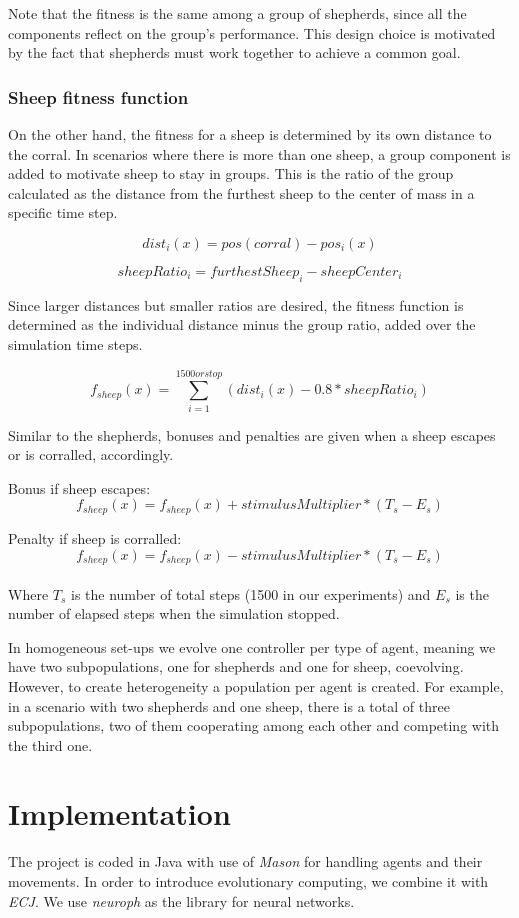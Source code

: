 \documentclass[conference]{IEEEtran}
\begin{document}
Note that the fitness is the same among a group of shepherds, since all the components reflect on the group's performance. This design choice is motivated by the fact that shepherds must work together to achieve a common goal. 

\subsubsection{Sheep fitness function}
On the other hand, the fitness for a sheep is determined by its own distance to the corral. In scenarios where there is more than one sheep, a group component is added to motivate sheep to stay in groups. This is the ratio of the group calculated as the distance from the furthest sheep to the center of mass in a specific time step. 

$$ dist_i(x) = pos(corral) - pos_i(x) $$

$$ sheepRatio_i = furthestSheep_i - sheepCenter_i $$

Since larger distances but smaller ratios are desired, the fitness function is determined as the individual distance minus the group ratio, added over the simulation time steps. 

$$ f_{sheep}(x) = \sum_{i=1}^{1500 or stop}(dist_i(x) - 0.8 * sheepRatio_i) $$

Similar to the shepherds, bonuses and penalties are given when a sheep escapes or is corralled, accordingly.  

Bonus if sheep escapes:
$$ f_{sheep}(x) = f_{sheep}(x) + stimulusMultiplier * (T_s - E_s) $$

Penalty if sheep is corralled:
$$ f_{sheep}(x) = f_{sheep}(x) - stimulusMultiplier * (T_s - E_s) $$\\
Where $T_s$ is the number of total steps (1500 in our experiments) and $E_s$ is the number of elapsed steps when the simulation stopped.

In homogeneous set-ups we evolve one controller per type of agent, meaning we have two subpopulations, one for shepherds and one for sheep, coevolving. However, to create heterogeneity a population per agent is created. For example, in a scenario with two shepherds and one sheep, there is a total of three subpopulations, two of them cooperating among each other and competing with the third one.  


\section{Implementation}
The project is coded in Java with use of \textit{Mason} for handling agents and their movements. In order to introduce evolutionary computing, we combine it with \textit{ECJ}. We use \textit{neuroph} as the library for neural networks. 
\end{document}
